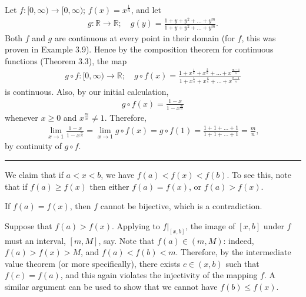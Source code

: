 \documentclass[letterpaper,10pt,english]{jupyterBook}
\begin{document}
Let \(f:[0,\infty)\to[0,\infty)\); \(f(x)=x^{\frac{1}{n}}\), and let
\begin{equation*}
\begin{split}
g:\mathbb{R}\to\mathbb{R};\hspace{1em} g(y)=\frac{1+y+y^2+\ldots+y^m}{1+y+y^2+\ldots+y^m}.
\end{split}
\end{equation*}
\sphinxAtStartPar
Both \(f\) and \(g\) are continuous at every point in their domain (for \(f\), this was proven in Example 3.9). Hence by the composition theorem for continuous functions (Theorem 3.3), the map
\begin{equation*}
\begin{split}
g\circ f:[0,\infty)\to\mathbb{R}; \hspace{1em} g\circ f(x) = \frac{1+x^{\frac{1}{n}}+x^{\frac{2}{n}}+\ldots+x^{\frac{m-1}{n}}}{1+x^{\frac{1}{n}}+x^{\frac{2}{n}}+\ldots+x^{\frac{n-1}{n}}}
\end{split}
\end{equation*}
\sphinxAtStartPar
is continuous. Also, by our initial calculation,
\begin{equation*}
\begin{split}
g\circ f(x) = \frac{1 - x}{1 - x^{\frac{m}{n}}}
\end{split}
\end{equation*}
\sphinxAtStartPar
whenever \(x\geq 0\) and \(x^{\frac{m}{n}}\neq 1\). Therefore,
\begin{equation*}
\begin{split}
\lim_{x\rightarrow 1}\frac{1 - x}{1 - x^{\frac{m}{n}}} = \lim_{x\rightarrow 1}g\circ f(x) = g\circ f(1) = \frac{1+1+\ldots+1}{1+1+\ldots+1} = \frac{m}{n},
\end{split}
\end{equation*}
\sphinxAtStartPar
by continuity of \(g\circ f\).


\bigskip\hrule\bigskip


\sphinxAtStartPar
{\hyperref[\detokenize{Problems:id34}]{}} We claim that if \(a < x < b\), we have \(f(a) < f(x) < f(b)\). To see this, note that if \(f(a) \geq f(x)\) then either \(f(a) = f(x)\), or \(f(a) > f(x)\).

If \(f(a)=f(x)\), then \(f\) cannot be bijective, which is a contradiction.

Suppose that \(f(a)>f(x)\). Applying  to \(f|_{[x,b]}\), the image of \([x,b]\) under \(f\) must an interval, \([m,M]\), say. Note that \(f(a)\in(m,M)\): indeed, \(f(a)>f(x)>M\), and \(f(a)<f(b)<m\). Therefore, by the intermediate value theorem (or  more specifically), there exists \(c \in (x, b)\) such that \(f(c) = f(a)\), and this again violates the injectivity of the mapping \(f\). A similar argument can be used to show that we cannot have \(f(b) \leq f(x)\).
\end{document}
